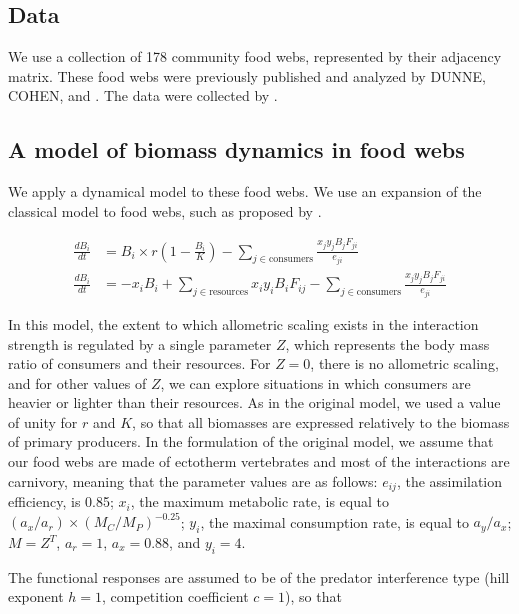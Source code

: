 \documentclass[12pt]{article}
\begin{document}
\subsection{Data}

We use a collection of 178 community food webs, represented by their adjacency matrix. These food webs were previously published and analyzed by DUNNE, COHEN, and \textcite{Havens1992}. The data were collected by \textcite{Gravel2011a}.

\subsection{A model of biomass dynamics in food webs}

We apply a dynamical model to these food webs. We use an expansion of the classical \textcite{Yodzis1992} model to food webs, such as proposed by \textcite{Brose2006a}. 

\begin{align}
	\frac{dB_{i}}{dt} & = B_{i}\times r\left(1-\frac{B_{i}}{K}\right) - \sum_{j\in\mathrm{consumers}}\frac{x_{j}y_{j}B_{j}F_{ji}}{e_{ji}}\\
	\frac{dB_{i}}{dt} & = -x_{i}B_{i} + \sum_{j\in\mathrm{resources}}x_{i}y_{i}B_{i}F_{ij} - \sum_{j\in\mathrm{consumers}}\frac{x_{j}y_{j}B_{j}F_{ji}}{e_{ji}}
\end{align}

In this model, the extent to which allometric scaling exists in the interaction strength is regulated by a single parameter $Z$, which represents the body mass ratio of consumers and their resources. For $Z = 0$, there is no allometric scaling, and for other values of $Z$, we can explore situations in which consumers are heavier or lighter than their resources. As in the original model, we used a value of unity for $r$ and $K$, so that all biomasses are expressed relatively to the biomass of primary producers. In the formulation of the original model, we assume that our food webs are made of ectotherm vertebrates and most of the interactions are carnivory, meaning that the parameter values are as follows: $e_{ij}$, the assimilation efficiency, is 0.85; $x_{i}$, the maximum metabolic rate, is equal to $(a_{x}/a_{r})\times(M_{C}/M_{P})^{-0.25}$; $y_{i}$, the maximal consumption rate, is equal to $a_{y}/a_{x}$; $M = Z^{T}$, $a_{r} = 1$, $a_{x} = 0.88$, and $y_{i} = 4$.

The functional responses are assumed to be of the predator interference type (hill exponent $h = 1$, competition coefficient $c = 1$), so that
\end{document}
